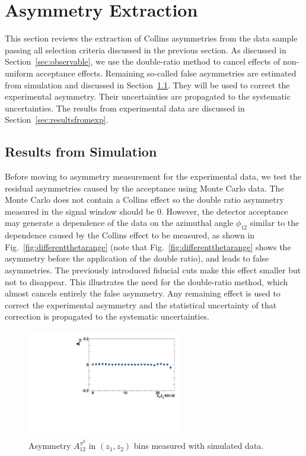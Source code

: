 \section{Asymmetry Extraction}
 
 This section reviews the extraction of Collins asymmetries from the data sample passing all selection criteria discussed in the previous section.
As discussed in Section~\ref{sec:observable}, we use the double-ratio method to cancel effects of non-uniform acceptance effects.
Remaining so-called false asymmetries are estimated from simulation and discussed in Section~\ref{sec:resutlsfrommc}. 
They will be used to correct the experimental asymmetry.  Their uncertainties are propagated to the systematic uncertainties.
The results from experimental data are discussed in Section~\ref{sec:resultsfromexp}.

\subsection{Results from Simulation}
\label{sec:resutlsfrommc}
Before moving to asymmetry measurement for the experimental data, we test the residual asymmetries caused by the acceptance using  Monte Carlo data. The Monte Carlo does not contain a Collins effect  so the double ratio asymmetry measured in the signal window should be 0. However, the detector acceptance may generate a dependence of the data on the azimuthal angle $\phi_{12}$ similar to the dependence caused by the Collins effect to be measured, as shown in Fig.~\ref{fig:differentthetarange} (note that  Fig.~\ref{fig:differentthetarange} shows the asymmetry before the application of the double ratio), and leads to false asymmetries. The previously introduced fiducial cuts make this effect smaller but  not to disappear.
This illustrates the need for the double-ratio method, which almost cancels entirely the false asymmetry. Any remaining effect 
is used to correct the experimental asymmetry and the statistical uncertainty of that correction is propagated to the systematic uncertainties.

\begin{figure}[b]
    \centering
    \includegraphics[width=0.6\textwidth,natwidth=250,natheight=100]{figure_asy/ComZ_Phi12_pi0.pdf}
    \caption{Asymmetry $A_{12}^{\pi^0}$ in  $(z_1,z_{2})$ bins measured with simulated data.}
    \label{fig:mc_example}
\end{figure}

